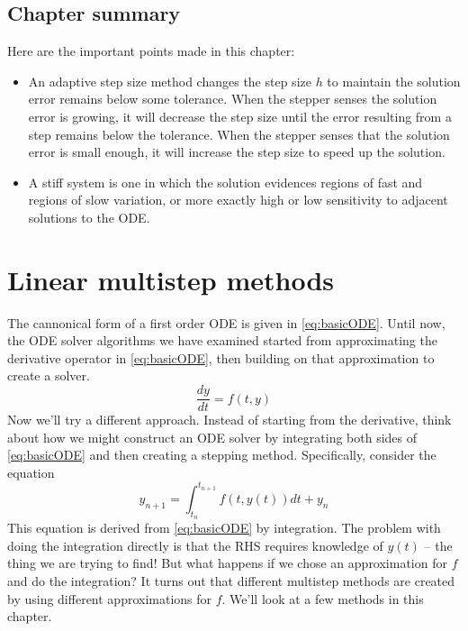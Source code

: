 \documentclass[hidelinks,notitlepage]{book}
\begin{document}
\section{Chapter summary}
Here are the important points made in this chapter:
\begin{itemize}
	\item An adaptive step size method changes the step size $h$ to maintain the solution error remains below some tolerance.  When the stepper senses the solution error is growing, it will decrease the step size until the error resulting from a step remains below the tolerance.  When the stepper senses that the solution error is small enough, it will increase the step size to speed up the solution.
	\item A stiff system is one in which the solution evidences regions of fast and regions of slow variation, or more exactly high or low sensitivity to adjacent solutions to the ODE.   
\end{itemize}

\chapter{Linear multistep methods}
The cannonical form of a first order ODE is given in \cref{eq:basicODE}.  Until now, the ODE solver algorithms we have examined started from approximating the derivative operator in \cref{eq:basicODE}, then building on that approximation to create a solver.  
\begin{equation}
\label{eq:basicODE}
\frac{dy}{dt} = f(t, y)
\end{equation}
Now we'll try a different approach.  Instead of starting from the derivative, think about how we might construct an ODE solver by integrating both sides of \cref{eq:basicODE} and then creating a stepping method.  Specifically, consider the equation
\begin{equation}
\label{eq:integratedODE}
y_{n+1} = \int_{t_n}^{t_{n+1}} f(t, y(t)) dt + y_n
\end{equation}
This equation is derived from \cref{eq:basicODE} by integration.  The problem with doing the integration directly is that the RHS requires knowledge of $y(t)$ -- the thing we are trying to find!  But what happens if we chose an approximation for $f$ and do the integration?  It turns out that different multistep methods are created by using different approximations for $f$.  We'll look at a few methods in this chapter.
\end{document}
